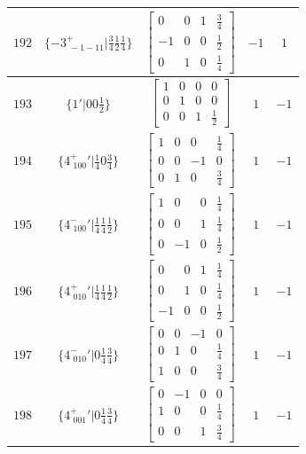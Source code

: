 \documentclass[fleqn,8pt]{jsarticle}
\begin{document}
\begin{longtable}{ccccc}
$ 192 $ & $ \{-3^{+}_{\,\,-1-11}|\frac{3}{4} \frac{1}{2} \frac{1}{4}\} $ & $ \begin{bmatrix} 0 & 0 & 1 & \frac{3}{4} \\ -1 & 0 & 0 & \frac{1}{2} \\ 0 & 1 & 0 & \frac{1}{4} \end{bmatrix} $ & $ -1 $ & $ 1 $ \\ \hline
$ 193 $ & $ \{1{}'|0 0 \frac{1}{2}\} $ & $ \begin{bmatrix} 1 & 0 & 0 & 0 \\ 0 & 1 & 0 & 0 \\ 0 & 0 & 1 & \frac{1}{2} \end{bmatrix} $ & $ 1 $ & $ -1 $ \\ \hline
$ 194 $ & $ \{4^{+}_{\,\,100}{}'|\frac{1}{4} 0 \frac{3}{4}\} $ & $ \begin{bmatrix} 1 & 0 & 0 & \frac{1}{4} \\ 0 & 0 & -1 & 0 \\ 0 & 1 & 0 & \frac{3}{4} \end{bmatrix} $ & $ 1 $ & $ -1 $ \\ \hline
$ 195 $ & $ \{4^{-}_{\,\,100}{}'|\frac{1}{4} \frac{1}{4} \frac{1}{2}\} $ & $ \begin{bmatrix} 1 & 0 & 0 & \frac{1}{4} \\ 0 & 0 & 1 & \frac{1}{4} \\ 0 & -1 & 0 & \frac{1}{2} \end{bmatrix} $ & $ 1 $ & $ -1 $ \\ \hline
$ 196 $ & $ \{4^{+}_{\,\,010}{}'|\frac{1}{4} \frac{1}{4} \frac{1}{2}\} $ & $ \begin{bmatrix} 0 & 0 & 1 & \frac{1}{4} \\ 0 & 1 & 0 & \frac{1}{4} \\ -1 & 0 & 0 & \frac{1}{2} \end{bmatrix} $ & $ 1 $ & $ -1 $ \\ \hline
$ 197 $ & $ \{4^{-}_{\,\,010}{}'|0 \frac{1}{4} \frac{3}{4}\} $ & $ \begin{bmatrix} 0 & 0 & -1 & 0 \\ 0 & 1 & 0 & \frac{1}{4} \\ 1 & 0 & 0 & \frac{3}{4} \end{bmatrix} $ & $ 1 $ & $ -1 $ \\ \hline
$ 198 $ & $ \{4^{+}_{\,\,001}{}'|0 \frac{1}{4} \frac{3}{4}\} $ & $ \begin{bmatrix} 0 & -1 & 0 & 0 \\ 1 & 0 & 0 & \frac{1}{4} \\ 0 & 0 & 1 & \frac{3}{4} \end{bmatrix} $ & $ 1 $ & $ -1 $ \\ \hline

\end{longtable}
\end{document}
